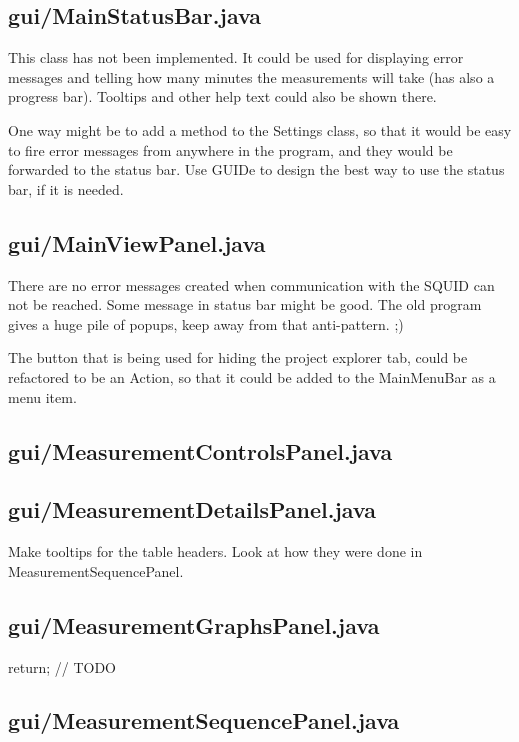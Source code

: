 \subsection{gui/MainStatusBar.java}

This class has not been implemented. It could be used for displaying error messages and telling how many minutes the measurements will take (has also a progress bar). Tooltips and other help text could also be shown there.

One way might be to add a method to the Settings class, so that it would be easy to fire error messages from anywhere in the program, and they would be forwarded to the status bar. Use GUIDe to design the best way to use the status bar, if it is needed.


\subsection{gui/MainViewPanel.java}

There are no error messages created when communication with the SQUID can not be reached. Some message in status bar might be good. The old program gives a huge pile of popups, keep away from that anti-pattern. ;)

The button that is being used for hiding the project explorer tab, could be refactored to be an Action, so that it could be added to the MainMenuBar as a menu item.


\subsection{gui/MeasurementControlsPanel.java}

\subsection{gui/MeasurementDetailsPanel.java}

Make tooltips for the table headers. Look at how they were done in MeasurementSequencePanel.


\subsection{gui/MeasurementGraphsPanel.java}
        return; // TODO

\subsection{gui/MeasurementSequencePanel.java}

